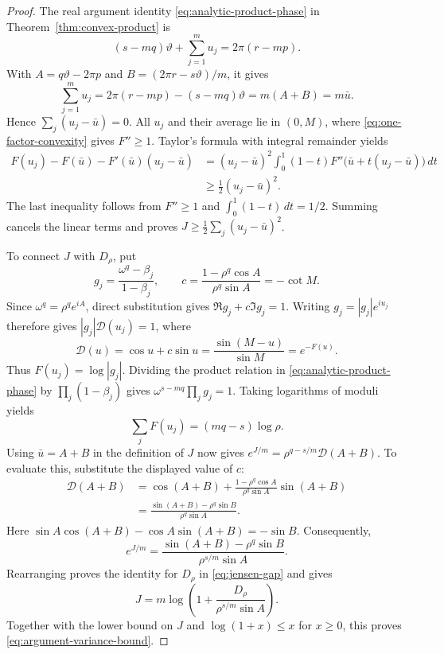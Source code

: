 \documentclass[11pt,a4paper]{article}
\theoremstyle{definition}
\theoremstyle{remark}
\numberwithin{equation}{section}
\begin{document}
\begin{proof}
The real argument identity \eqref{eq:analytic-product-phase} in Theorem~\ref{thm:convex-product} is
\[
 (s-mq)\vartheta+\sum_{j=1}^m u_j=2\pi(r-mp).
\]
With $A=q\vartheta-2\pi p$ and $B=(2\pi r-s\vartheta)/m$, it gives
\[
 \sum_{j=1}^m u_j
 =2\pi(r-mp)-(s-mq)\vartheta=m(A+B)=m\bar u.
\]
Hence $\sum_j(u_j-\bar u)=0$.
All $u_j$ and their average lie in $(0,M)$, where \eqref{eq:one-factor-convexity} gives $F''\ge1$. Taylor's formula with integral remainder yields
\[
 \begin{aligned}
 F(u_j)-F(\bar u)-F'(\bar u)(u_j-\bar u)
 &=(u_j-\bar u)^2\int_0^1(1-t)
 F''\bigl(\bar u+t(u_j-\bar u)\bigr)\,dt\\
 &\ge\tfrac12(u_j-\bar u)^2.
 \end{aligned}
\]
The last inequality follows from $F''\ge1$ and $\int_0^1(1-t)\,dt=1/2$. Summing cancels the linear terms and proves $J\ge\tfrac12\sum_j(u_j-\bar u)^2$.

To connect $J$ with $D_\rho$, put
\[
 g_j=\frac{\omega^q-\beta_j}{1-\beta_j},\qquad
 c=\frac{1-\rho^q\cos A}{\rho^q\sin A}=-\cot M.
\]
Since $\omega^q=\rho^qe^{iA}$, direct substitution gives $\Re g_j+c\Im g_j=1$. Writing $g_j=|g_j|e^{iu_j}$ therefore gives $|g_j|\mathcal D(u_j)=1$, where
\[
 \mathcal D(u)=\cos u+c\sin u
 =\frac{\sin(M-u)}{\sin M}=e^{-F(u)}.
\]
Thus $F(u_j)=\log|g_j|$. Dividing the product relation in \eqref{eq:analytic-product-phase} by $\prod_j(1-\beta_j)$ gives $\omega^{s-mq}\prod_jg_j=1$. Taking logarithms of moduli yields
\[
 \sum_jF(u_j)=(mq-s)\log\rho.
\]
Using $\bar u=A+B$ in the definition of $J$ now gives $e^{J/m}=\rho^{q-s/m}\mathcal D(A+B)$. To evaluate this, substitute the displayed value of $c$:
\[
 \begin{aligned}
 \mathcal D(A+B)
 &=\cos(A+B)+\frac{1-\rho^q\cos A}{\rho^q\sin A}\sin(A+B)\\
 &=\frac{\sin(A+B)-\rho^q\sin B}{\rho^q\sin A}.
 \end{aligned}
\]
Here $\sin A\cos(A+B)-\cos A\sin(A+B)=-\sin B$. Consequently,
\[
 e^{J/m}=\frac{\sin(A+B)-\rho^q\sin B}{\rho^{s/m}\sin A}.
\]
Rearranging proves the identity for $D_\rho$ in \eqref{eq:jensen-gap} and gives
\[
 J=m\log\left(1+\frac{D_\rho}{\rho^{s/m}\sin A}\right).
\]
Together with the lower bound on $J$ and $\log(1+x)\le x$ for $x\ge0$, this proves \eqref{eq:argument-variance-bound}.


\end{proof}
\end{document}
